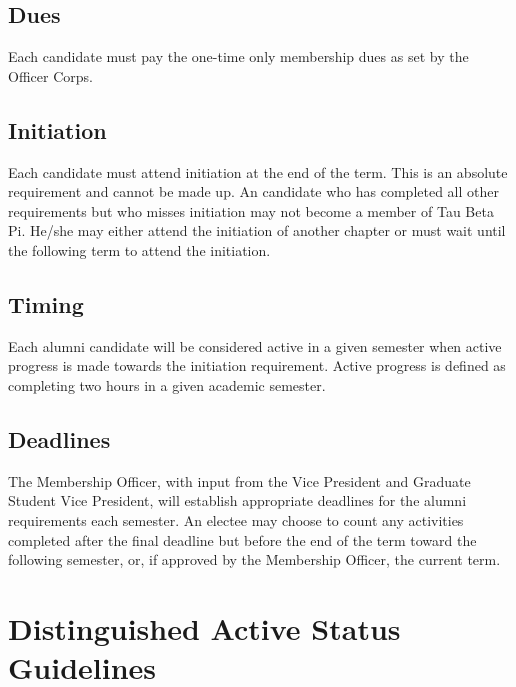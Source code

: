 \section{Dues} Each candidate must pay the one-time only membership dues as set by the Officer Corps. 
\section{Initiation} Each candidate must attend initiation at the end of the term. This is an absolute requirement and cannot be made up. An candidate who has completed all other requirements but who misses initiation may not become a member of Tau Beta Pi. He/she may either attend the initiation of another chapter or must wait until the following term to attend the initiation.  
\section{Timing} Each alumni candidate will be considered active in a given semester when active progress is made towards the initiation requirement. Active progress is defined as completing two hours in a given academic semester.
\section{Deadlines}  The Membership Officer, with input from the Vice President and Graduate Student Vice President, will establish appropriate deadlines for the alumni requirements each semester. An electee may choose to count any activities completed after the final deadline but before the end of the term toward the following semester, or, if approved by the Membership Officer, the current term.





\chapter{Distinguished Active Status Guidelines}\label{sec:DAstatus}
